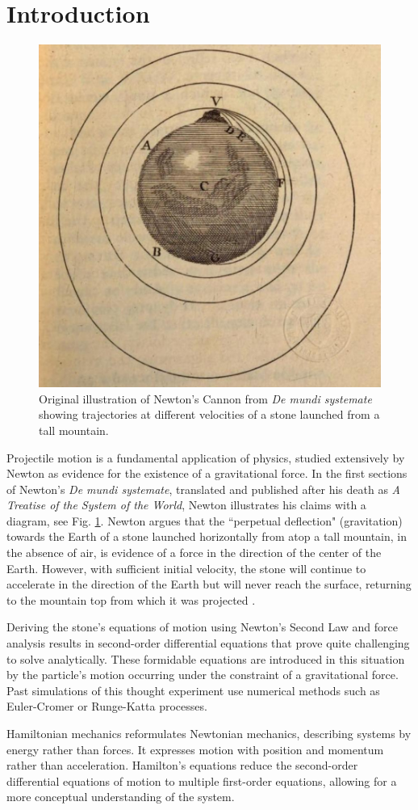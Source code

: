 \documentclass[aps,twocolumn]{revtex4-1}
\begin{document}
\section{Introduction} 
\begin{figure}
    \centering
    \includegraphics[width=0.5\linewidth]{newtonDiagram.png}
    \caption{Original illustration of Newton's Cannon from \textit{De mundi systemate} \cite{Newton} showing trajectories at different velocities of a stone launched from a tall mountain.}
    \label{newtonFig}
\end{figure}
Projectile motion is a fundamental application of physics, studied extensively by Newton as evidence for the existence of a gravitational force. In the first sections of Newton's \textit{De mundi systemate}, translated and published after his death as \textit{A Treatise of the System of the World}, Newton illustrates his claims with a diagram, see Fig. \ref{newtonFig}. Newton argues that the ``perpetual deflection" (gravitation) towards the Earth of a stone launched horizontally from atop a tall mountain, in the absence of air, is evidence of a force in the direction of the center of the Earth. However, with sufficient initial velocity, the stone will continue to accelerate in the direction of the Earth but will never reach the surface, returning to the mountain top from which it was projected \cite{Newton}.

Deriving the stone's equations of motion using Newton's Second Law and force analysis results in second-order differential equations that prove quite challenging to solve analytically. These formidable equations are introduced in this situation by the particle's motion occurring under the constraint of a gravitational force.  Past simulations\cite{noragulfa} of this thought experiment use numerical methods such as Euler-Cromer or Runge-Katta processes.

Hamiltonian mechanics reformulates Newtonian mechanics, describing systems by energy rather than forces. It expresses motion with position and momentum rather than acceleration. Hamilton's equations reduce the second-order differential equations of motion to multiple first-order equations, allowing for a more conceptual understanding of the system.
\end{document}

